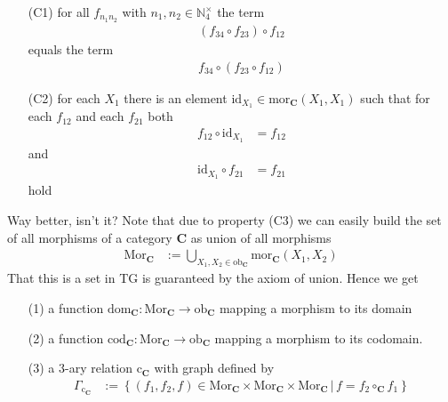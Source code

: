 \begin{enumerate}
\item[(C1)]
for all $f_{n_{1}n_{2}}$ with $n_{1},n_{2} \in \mathbb{N}_{4}^{\times}$ the term
\begin{align*}
  (f_{34} \circ f_{23})
  \circ
  f_{12}
\end{align*}
equals the term
\begin{align*}
  f_{34}
  \circ
  (f_{23} \circ f_{12})
\end{align*}
\item[(C2)]
for each $X_{1}$ there is an element $\mathrm{id}_{X_{1}} \in \mathrm{mor}_{\mathbf{C}}(X_{1},X_{1})$ such that for each $f_{12}$ and each $f_{21}$ both
\begin{align*}
  f_{12}
  \circ
  \mathrm{id}_{X_{1}}
  &=
  f_{12}
\end{align*}
and
\begin{align*}
  \mathrm{id}_{X_{1}}
  \circ
  f_{21}
  &=
  f_{21}
\end{align*}
hold
\end{enumerate}
Way better, isn't it? Note that due to property (C3) we can easily build the set of all morphisms of a category $\mathbf{C}$ as union of all morphisms
\begin{align*}
  \mathrm{Mor}_{\mathbf{C}}
  &:=
  \bigcup_{X_{1},X_{2} \in \mathrm{ob}_{\mathbf{C}}}
  \mathrm{mor}_{\mathbf{C}}(X_{1},X_{2})
\end{align*}
That this is a set in TG is guaranteed by the axiom of union. Hence we get
\begin{enumerate}
\item[(1)]
a function $\mathrm{dom}_{\mathbf{C}} \colon \mathrm{Mor}_{\mathbf{C}} \rightarrow \mathrm{ob}_{\mathbf{C}}$ mapping a morphism to its domain
\item[(2)]
a function $\mathrm{cod}_{\mathbf{C}} \colon \mathrm{Mor}_{\mathbf{C}} \rightarrow \mathrm{ob}_{\mathbf{C}}$ mapping a morphism to its codomain.
\item[(3)]
a $3$-ary relation $\mathrm{c}_{\mathbf{C}}$ with graph defined by
\begin{align*}
  \Gamma_{\mathrm{c}_{\mathbf{C}}}
  &:=
  \left\lbrace
      (f_{1},f_{2},f)
      \in
      \mathrm{Mor}_{\mathbf{C}}
      \times
      \mathrm{Mor}_{\mathbf{C}}
      \times
      \mathrm{Mor}_{\mathbf{C}}
    \,
    \vert
    \,
      f
      =
      f_{2}
      \circ_{\mathbf{C}}
      f_{1}
  \right\rbrace
\end{align*}
\end{enumerate}
